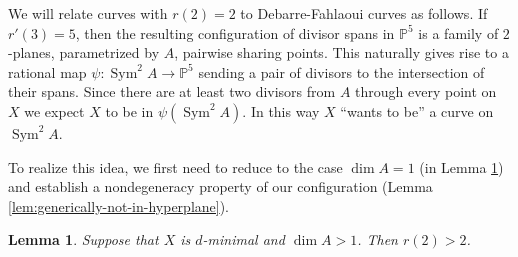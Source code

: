 \documentclass[11pt]{amsart}
\newcommand{\PP}{\mathbb{P}}
\newcommand{\pp}{\mathbb{P}}
\DeclareMathOperator{\Sym}{Sym}
\newtheorem{lemma}[theorem]{Lemma}
\theoremstyle{definition}
\theoremstyle{remark}
\begin{document}
We will relate curves with $r(2)=2$ to Debarre-Fahlaoui curves as follows. If $r'(3)=5$, then the resulting configuration of divisor spans in \(\pp^5\) is a family of $2$-planes, parametrized by $A$, pairwise sharing points. This naturally gives rise to a rational map $\psi\colon \Sym^2A \to \PP^5$ sending a pair of divisors to the intersection of their spans. Since there are at least two divisors from $A$ through every point on $X$ we expect $X$ to be in $\psi(\Sym^2 A)$. In this way $X$ ``wants to be'' a curve on $\Sym^2 A$.

To realize this idea, we first need to reduce to the case $\dim A = 1$ (in Lemma \ref{lem:dimg1}) and establish a  nondegeneracy property of our configuration (Lemma \ref{lem:generically-not-in-hyperplane}).

\begin{lemma}\label{lem:dimg1}
Suppose that \(X\) is \(d\)-minimal and \(\dim A > 1\).  Then \(r(2) > 2\).
\end{lemma}
\end{document}
